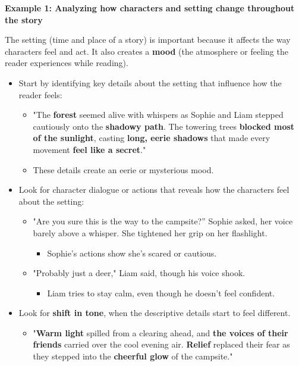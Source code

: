 \documentclass[12pt]{article}
\begin{document}
\begin{tcolorbox}[colframe=black!60, colback=white, 
coltitle=black, colbacktitle=black!15, fonttitle=\bfseries\Large, 
title=Examples, halign title=center, left=10pt, right=10pt, top=10pt, bottom=15pt]

\textbf{Example 1: Analyzing how characters and setting change throughout the story}


The setting (time and place of a story) is important because it affects the way characters feel and act. It also creates a \textbf{mood} (the atmosphere or feeling the reader experiences while reading). 

\begin{itemize}
    \item Start by identifying key details about the setting that influence how the reader feels:
    \begin{itemize}
        \item "The \textbf{forest} seemed alive with whispers as Sophie and Liam stepped cautiously onto the \textbf{shadowy path}. The towering trees \textbf{blocked most of the sunlight}, casting \textbf{long, eerie shadows} that made every movement \textbf{feel like a secret}."
        \item These details create an eerie or mysterious mood.
    \end{itemize}
\item Look for character dialogue or actions that reveals how the characters feel about the setting:
\begin{itemize}
    \item "Are you sure this is the way to the campsite?” Sophie asked, her voice barely above a whisper. She tightened her grip on her flashlight.
    \begin{itemize}
        \item Sophie's actions show she's scared or cautious.
    \end{itemize}
    \item "Probably just a deer," Liam said, though his voice shook.
    \begin{itemize}
        \item Liam tries to stay calm, even though he doesn't feel confident.
    \end{itemize}
\end{itemize}
\item Look for \textbf{shift in tone}, when the descriptive details start to feel different.
\begin{itemize}
    \item "\textbf{Warm light} spilled from a clearing ahead, and\textbf{ the voices of their friends} carried over the cool evening air. \textbf{Relief} replaced their fear as they stepped into the \textbf{cheerful glow} of the campsite."

\end{itemize}
\end{itemize}
\end{tcolorbox}
\end{document}
